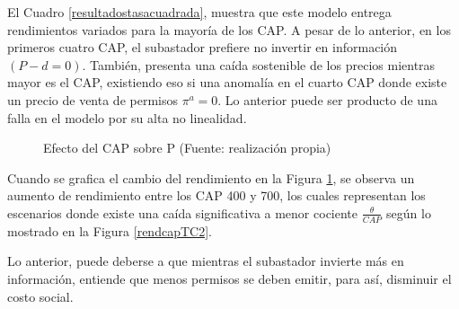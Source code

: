 El Cuadro \ref{resultadostasacuadrada}, muestra que este modelo entrega rendimientos variados para la mayoría de los CAP. A pesar de lo anterior, en los primeros cuatro CAP, el subastador prefiere no invertir en información $(P-d=0)$. También, presenta una caída sostenible de los precios mientras mayor es el CAP, existiendo eso si una anomalía en el cuarto CAP donde existe un precio de venta de permisos $\pi^a=0$. Lo anterior puede ser producto de una falla en el modelo por su alta no linealidad.
\vspace{2.5mm}

\begin{figure}[H]
\centering
{}
\caption{{\footnotesize Efecto del CAP sobre P (Fuente: realización propia)}}
\label{rendcapTC}
\end{figure}

Cuando se grafica el cambio del rendimiento en la Figura \ref{rendcapTC}, se observa un aumento de rendimiento entre los CAP 400 y 700, los cuales representan los escenarios donde existe una caída significativa a menor cociente $\frac{\theta}{CAP}$ según lo mostrado en la Figura \ref{rendcapTC2}.
\vspace{2.5mm}

Lo anterior, puede deberse a que mientras el subastador invierte más en información, entiende que menos permisos se deben emitir, para así, disminuir el costo social.
\vspace{2.5mm}

